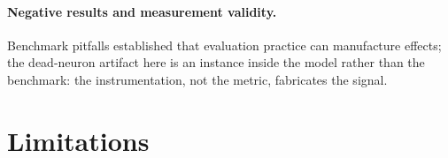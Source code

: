 \documentclass[review,12pt,number]{elsarticle}
\begin{document}
\paragraph{Negative results and measurement validity.} Benchmark pitfalls
\cite{musgrave2020,lucic2018,melis2018,agarwal2021,lipton2019} established
that evaluation practice can manufacture effects; the dead-neuron artifact
here is an instance inside the model rather than the benchmark: the
instrumentation, not the metric, fabricates the signal.

\section{Limitations}
\label{sec:limitations}
\end{document}
